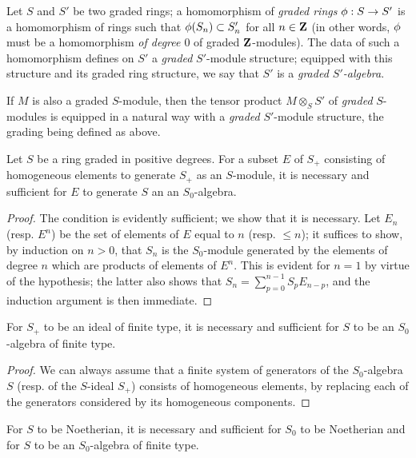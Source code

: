 \begin{env}[2.1.2]
Let $S$ and $S'$ be two graded rings;
a homomorphism of \emph{graded rings $\vphi:S\to S'$} is a homomorphism of rings such that $\phi(S_n)\subset S_n'$ for all $n\in\mathbf{Z}$ (in other words, $\phi$ must be a homomorphism \emph{of degree $0$} of graded $\mathbf{Z}$-modules).
The data of such a homomorphism defines on $S'$ a \emph{graded} $S'$-module structure;
equipped with this structure and its graded ring structure, we say that $S'$ is a \emph{graded $S'$-algebra}.

If $M$ is also a graded $S$-module, then the tensor product $M\otimes_S S'$ of \emph{graded} $S$-modules is equipped in a natural way with a \emph{graded} $S'$-module structure, the grading being defined as above.
\end{env}

\begin{lemma}[2.1.3]
\label{II.2.1.3}
Let $S$ be a ring graded in positive degrees.
For a subset $E$ of $S_+$ consisting of homogeneous elements to generate $S_+$ as an $S$-module, it is necessary and sufficient for $E$ to generate $S$ an an $S_0$-algebra.
\end{lemma}

\begin{proof}
The condition is evidently sufficient; we show that it is necessary.
Let $E_n$ (resp. $E^n$) be the set of elements of $E$ equal to $n$ (resp. $\leq n$);
it suffices to show, by induction on $n>0$, that $S_n$ is the $S_0$-module generated by the elements of degree $n$ which are products of elements of $E^n$.
This is evident for $n=1$ by virtue of the hypothesis;
the latter also shows that $S_n=\sum_{p=0}^{n-1}S_p E_{n-p}$, and the induction argument is then immediate.
\end{proof}

\begin{corollary}[2.1.4]
\label{II.2.1.4}
For $S_+$ to be an ideal of finite type, it is necessary and sufficient for $S$ to be an $S_0$-algebra of finite type.
\end{corollary}

\begin{proof}
We can always assume that a finite system of generators of the $S_0$-algebra $S$ (resp. of the $S$-ideal $S_+$) consists of homogeneous elements, by replacing each of the generators considered by its homogeneous components.
\end{proof}

\begin{corollary}[2.1.5]
\label{II.2.1.5}
For $S$ to be Noetherian, it is necessary and sufficient for $S_0$ to be Noetherian and for $S$ to be an $S_0$-algebra of finite type.
\end{corollary}

